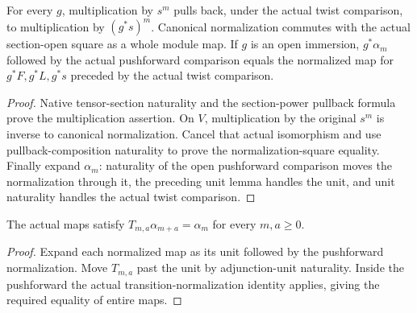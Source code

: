 \begin{lemma}
\label{lem:cech-line-native-normalization-pullback}
\leanok
For every $g$, multiplication by $s^m$ pulls back, under the actual
twist comparison, to multiplication by $(g^*s)^m$. Canonical
normalization commutes with the actual section-open square as a whole
module map. If $g$ is an open immersion, $g^*\alpha_m$ followed by the
actual pushforward comparison equals the normalized map for $g^*F,g^*L,g^*s$
preceded by the actual twist comparison.
\end{lemma}
\begin{proof}
Native tensor-section naturality and the section-power pullback formula
prove the multiplication assertion. On $V$, multiplication by the
original $s^m$ is inverse to canonical normalization. Cancel that actual
isomorphism and use pullback-composition naturality to prove the
normalization-square equality. Finally expand $\alpha_m$: naturality
of the open pushforward comparison moves the normalization through it,
the preceding unit lemma handles the unit, and unit naturality handles
the actual twist comparison.
\end{proof}

\begin{lemma}
\label{lem:cech-line-native-pushforward-transition}
\leanok
The actual maps satisfy $T_{m,a}\alpha_{m+a}=\alpha_m$ for every
$m,a\geq0$.
\end{lemma}
\begin{proof}
Expand each normalized map as its unit followed by the pushforward
normalization. Move $T_{m,a}$ past the unit by adjunction-unit
naturality. Inside the pushforward the actual transition-normalization
identity applies, giving the required equality of entire maps.
\end{proof}

